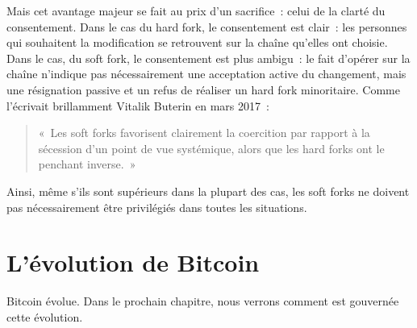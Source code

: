 
Mais cet avantage majeur se fait au prix d'un sacrifice~: celui de la clarté du consentement. Dans le cas du hard fork, le consentement est clair~: les personnes qui souhaitent la modification se retrouvent sur la chaîne qu'elles ont choisie. Dans le cas, du soft fork, le consentement est plus ambigu~: le fait d'opérer sur la chaîne n'indique pas nécessairement une acceptation active du changement, mais une résignation passive et un refus de réaliser un hard fork minoritaire. Comme l'écrivait brillamment Vitalik Buterin en mars 2017~:

\begin{quote}
«~Les soft forks favorisent clairement la coercition par rapport à la sécession d'un point de vue systémique, alors que les hard forks ont le penchant inverse.~»
\end{quote} %

Ainsi, même s'ils sont supérieurs dans la plupart des cas, les soft forks ne doivent pas nécessairement être privilégiés dans toutes les situations.

\section*{L'évolution de Bitcoin}

Bitcoin évolue. Dans le prochain chapitre, nous verrons comment est gouvernée cette évolution. %

\printendnotes